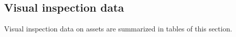 %	

\subsection{Visual inspection data}
Visual inspection data on assets are summarized in tables of this section. %

